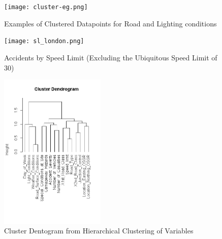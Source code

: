 \documentclass{neu_handout}
\begin{document}
\begin{figure}[!htb]
    \begin{center}
      \texttt{[image: cluster-eg.png]}
      \caption{Examples of Clustered Datapoints for Road and Lighting conditions}
    \end{center}
\end{figure}


\begin{figure}[!htb]
    \begin{center}
      \texttt{[image: sl\_london.png]}
      \caption{Accidents by Speed Limit (Excluding the Ubiquitous Speed Limit of 30)}
    \end{center}
\end{figure}

\begin{figure}[!htb]
    \begin{center}
      \includegraphics[height=7.5cm,keepaspectratio]{Dendrogram-of-variable-cluster.png}
      \caption{Cluster Dentogram from Hierarchical Clustering of Variables}
    \end{center}
\end{figure}
\end{document}

